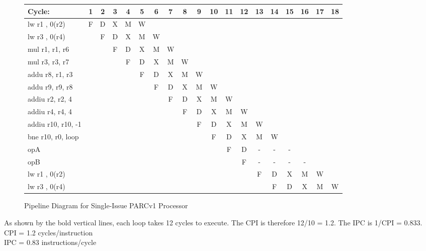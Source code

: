 \documentclass[10pt]{article}
\begin{document}
\begin{figure}[H]
\centering
{\setlength{\tabcolsep}{2pt}
\begin{tabular}{|l|c|c|c|c!{\vrule width 1.5pt}c|c|c|c|c|c|c|c|c|c|c|c!{\vrule width 1.5pt}c|c|}
\hline
Cycle:            & 1 & 2 & 3 & 4 & 5 & 6 & 7 & 8 & 9 & 10 & 11 & 12 & 13 & 14 & 15 & 16 & 17 & 18 \\ \hline
lw r1 , 0(r2)     & F & D & X & M & W &   &   &   &   &    &    &    &    &    &    &    &    &    \\ \hline
lw r3 , 0(r4)     &   & F & D & X & M & W &   &   &   &    &    &    &    &    &    &    &    &    \\ \hline
mul r1, r1, r6    &   &   & F & D & X & M & W &   &   &    &    &    &    &    &    &    &    &    \\ \hline
mul r3, r3, r7    &   &   &   & F & D & X & M & W &   &    &    &    &    &    &    &    &    &    \\ \hline
addu r8, r1, r3   &   &   &   &   & F & D & X & M & W &    &    &    &    &    &    &    &    &    \\ \hline
addu r9, r9, r8   &   &   &   &   &   & F & D & X & M & W  &    &    &    &    &    &    &    &    \\ \hline
addiu r2, r2, 4   &   &   &   &   &   &   & F & D & X & M  & W  &    &    &    &    &    &    &    \\ \hline
addiu r4, r4, 4   &   &   &   &   &   &   &   & F & D & X  & M  & W  &    &    &    &    &    &    \\ \hline
addiu r10, r10, -1&   &   &   &   &   &   &   &   & F & D  & X  & M  & W  &    &    &    &    &    \\ \hline
bne r10, r0, loop &   &   &   &   &   &   &   &   &   & F  & D  & X  & M  & W  &    &    &    &    \\ \hline
opA               &   &   &   &   &   &   &   &   &   &    & F  & D  & -  & -  & -  &    &    &    \\ \hline
opB               &   &   &   &   &   &   &   &   &   &    &    & F  & -  & -  & -  & -  &    &    \\ \hline
lw r1 , 0(r2)     &   &   &   &   &   &   &   &   &   &    &    &    & F  & D  & X  & M  & W  &    \\ \hline
lw r3 , 0(r4)     &   &   &   &   &   &   &   &   &   &    &    &    &    & F  & D  & X  & M  & W  \\ \hline
\end{tabular}
}
\caption{Pipeline Diagram for Single-Issue PARCv1 Processor}
\end{figure}
As shown by the bold vertical lines, each loop takes 12 cycles to execute. The CPI is therefore 12/10 = 1.2. The IPC is 1/CPI = 0.833.\\
CPI = 1.2 cycles/instruction\\
IPC = 0.83 instructions/cycle\\
\end{document}
